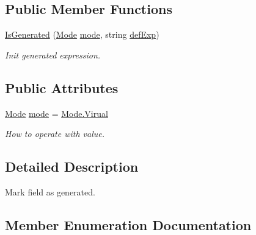 \subsection*{Public Member Functions}
\begin{DoxyCompactItemize}
\item 
\mbox{\hyperlink{class_uniform_data_operator_1_1_sql_1_1_attributes_1_1_is_generated_ae54943cf65edc20532518f10236ded09}{Is\+Generated}} (\mbox{\hyperlink{class_uniform_data_operator_1_1_sql_1_1_attributes_1_1_is_generated_aa8286a355a1ac86ccd56cf5b44f5ed59}{Mode}} \mbox{\hyperlink{class_uniform_data_operator_1_1_sql_1_1_attributes_1_1_is_generated_a9721250897ee9813cccc2aaa17ec8983}{mode}}, string \mbox{\hyperlink{class_uniform_data_operator_1_1_sql_1_1_attributes_1_1_default_a1ba564b7f35af4395bafa39d6f5f69dc}{def\+Exp}})
\begin{DoxyCompactList}\small\item\em Init generated expression. \end{DoxyCompactList}\end{DoxyCompactItemize}
\subsection*{Public Attributes}
\begin{DoxyCompactItemize}
\item 
\mbox{\hyperlink{class_uniform_data_operator_1_1_sql_1_1_attributes_1_1_is_generated_aa8286a355a1ac86ccd56cf5b44f5ed59}{Mode}} \mbox{\hyperlink{class_uniform_data_operator_1_1_sql_1_1_attributes_1_1_is_generated_a9721250897ee9813cccc2aaa17ec8983}{mode}} = \mbox{\hyperlink{class_uniform_data_operator_1_1_sql_1_1_attributes_1_1_is_generated_aa8286a355a1ac86ccd56cf5b44f5ed59aa6d194ab7efe0417c28a02b8a8997bd0}{Mode.\+Virual}}
\begin{DoxyCompactList}\small\item\em How to operate with value. \end{DoxyCompactList}\end{DoxyCompactItemize}


\subsection{Detailed Description}
Mark field as generated. 



\subsection{Member Enumeration Documentation}
\mbox{\label{class_uniform_data_operator_1_1_sql_1_1_attributes_1_1_is_generated_aa8286a355a1ac86ccd56cf5b44f5ed59}} 
